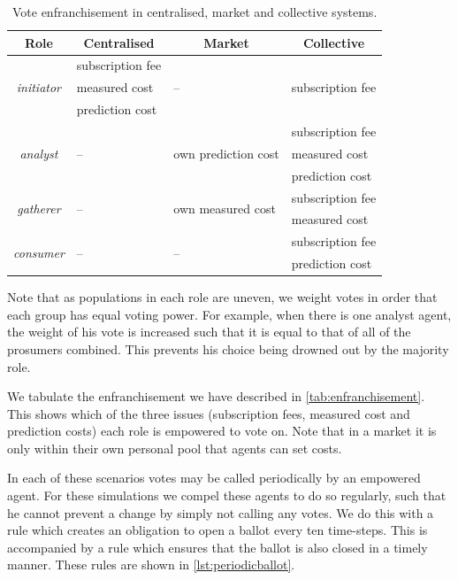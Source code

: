 \begin{table}
\centering
\caption{Vote enfranchisement in centralised, market and collective systems.}\label{tab:enfranchisement}
\begin{tabularx}{\textwidth}{c|lll}
Role & \multicolumn{1}{c}{Centralised} & \multicolumn{1}{c}{Market} & \multicolumn{1}{c}{Collective} \\
\hline
\multirow{3}{*}{\emph{initiator}} & subscription fee & \multirow{3}{*}{--} & \multirow{3}{*}{subscription fee} \\
& measured cost & & \\
& prediction cost & & \\
\hline
\multirow{3}{*}{\emph{analyst}} & \multirow{3}{*}{--} &  \multirow{3}{*}{own prediction cost} & subscription fee \\
& & & measured cost \\
& & & prediction cost \\
\hline
\multirow{2}{*}{\emph{gatherer}} & \multirow{2}{*}{--} & \multirow{2}{*}{own measured cost} & subscription fee \\
& & & measured cost \\
\hline
\multirow{2}{*}{\emph{consumer}} & \multirow{2}{*}{--} & \multirow{2}{*}{--} & subscription fee \\
& & & prediction cost \\
\end{tabularx}
\end{table}

Note that as populations in each role are uneven, we weight votes in order
that each group has equal voting power. For example, when there is one analyst
agent, the weight of his vote is increased such that it is equal to that of all
of the prosumers combined. This prevents his choice being drowned out by the
majority role.

We tabulate the enfranchisement we have described in
\autoref{tab:enfranchisement}. This shows which of the three issues
(subscription fees, measured cost and prediction costs) each role is empowered
to vote on. Note that in a market it is only within their own personal pool
that agents can set costs.

In each of these scenarios votes may be called periodically by an empowered
agent. For these simulations we compel these agents to do so regularly, such
that he cannot prevent a change by simply not calling any votes. We do this
with a rule which creates an obligation to open a ballot every ten time-steps.
This is accompanied by a  rule which ensures that the ballot is also closed in
a timely manner. These rules are shown in \autoref{lst:periodicballot}.

